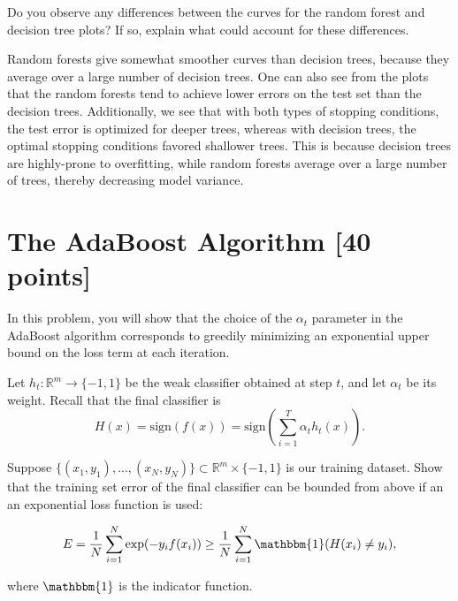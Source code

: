 \problem[4]
Do you observe any differences between the curves for the random forest and decision tree plots? If so, explain what could account for these differences.

\begin{solution}
Random forests give somewhat smoother curves than decision trees, because they average over a large number of decision trees. One can also see from the plots that the random forests tend to achieve lower errors on the test set than the decision trees. Additionally, we see that with both types of stopping conditions, the test error is optimized for deeper trees, whereas with decision trees, the optimal stopping conditions favored shallower trees. This is because decision trees are highly-prone to overfitting, while random forests average over a large number of trees, thereby decreasing model variance. 
\end{solution}



\newpage
\section{The AdaBoost Algorithm [40 points]}

In this problem, you will show that the choice of the $\alpha_t$ parameter in
the AdaBoost algorithm corresponds to greedily minimizing an exponential upper
bound on the loss term at each iteration.

\problem[3]
Let $h_t: \mathbb{R}^m \rightarrow \{-1,1\}$ be the weak classifier obtained at step $t$, and let $\alpha_t$ be
its weight. Recall that the final classifier is $$H(x) = \text{sign}(f(x)) = \text{sign} \left(\sum\limits_{i=1}^T \alpha_{t}h_t(x) \right).$$

Suppose $\{(x_1, y_1), ..., (x_N, y_N)\} \subset \mathbb{R}^m \times \{-1,1\}$ is our training dataset.  Show that the training set error of the final classifier can be bounded from
above if an an exponential loss function is used:

$$E = \frac{1}{N} \sum\limits_{i=1}^N \exp(-y_{i}f(x_i)) \geq \frac{1}{N} \sum\limits_{i=1}^N \mathbbm{1}(H(x_i) \neq y_i),$$

where $\mathbbm{1}$ is the indicator function.

